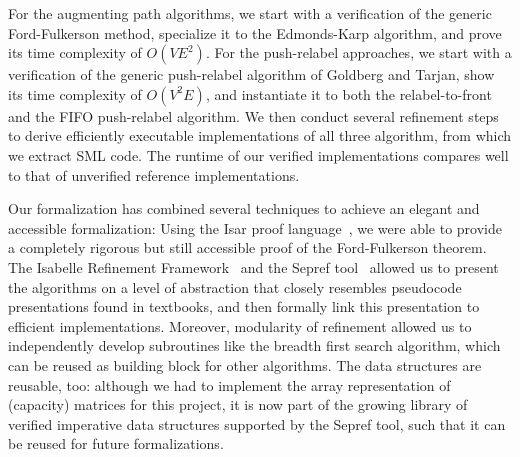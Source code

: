 \documentclass[smallcondensed]{svjour3}     %
\begin{document}
  For the augmenting path algorithms, we start with a verification of the generic Ford-Fulkerson method, 
  specialize it to the Edmonds-Karp algorithm, and prove its time complexity of $O(VE^2)$.
  For the push-relabel approaches, we start with a verification of the generic push-relabel algorithm of Goldberg and Tarjan, show its time complexity of $O(V^2E)$, and
  instantiate it to both the relabel-to-front and the FIFO push-relabel algorithm.
  We then conduct several refinement steps to derive efficiently executable implementations of all three algorithm, from which we extract SML code.
  The runtime of our verified implementations compares well to that of unverified reference implementations.
  
  Our formalization has combined several techniques to achieve an elegant and accessible formalization: 
  Using the Isar proof language~\cite{Wenzel99}, we were able to provide a completely rigorous but 
  still accessible proof of the Ford-Fulkerson theorem. The Isabelle Refinement Framework~\cite{LaTu12,La12} and the Sepref tool~\cite{La15,La16}
  allowed us to present the algorithms on a level 
  of abstraction that closely resembles pseudocode presentations found in textbooks, and then formally link this presentation to efficient
  implementations. Moreover, modularity of refinement allowed us to independently develop subroutines like the breadth first search algorithm, 
  which can be reused as building block for other algorithms.
  The data structures are reusable, too: although we had to implement the array representation of (capacity) matrices for this project, it is now part of the 
  growing library of verified imperative data structures supported by the Sepref tool, such that it can be reused for future formalizations.
  
\end{document}
